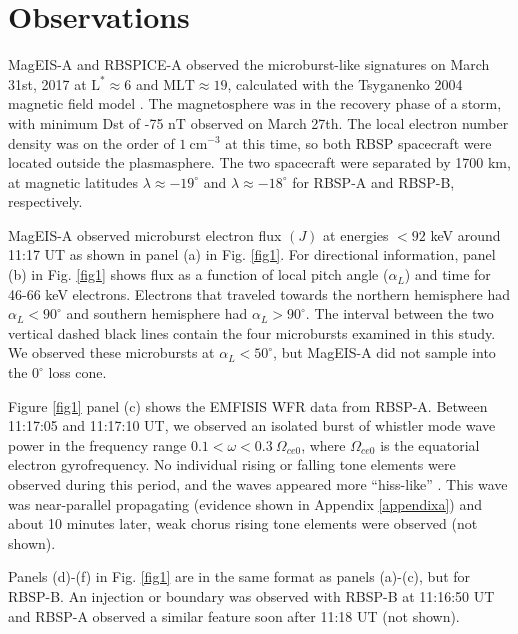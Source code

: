 \section{Observations} \label{obs}
MagEIS-A and RBSPICE-A observed the microburst-like signatures on March 31st, 2017 at $\mathrm{L}^* \approx 6$ and $\mathrm{MLT} \approx 19$, calculated with the Tsyganenko 2004 magnetic field model \citep{Tsyganenko2005}. The magnetosphere was in the recovery phase of a storm, with minimum Dst of -75 nT observed on March 27th. The local electron number density was on the order of $1 \ \mathrm{cm}^{-3}$ at this time, so both RBSP spacecraft were located outside the plasmasphere. The two spacecraft were separated by 1700 km, at magnetic latitudes $\lambda {\approx} -19^\circ$ and $\lambda {\approx} -18^\circ$ for RBSP-A and RBSP-B, respectively.

MagEIS-A observed microburst electron flux $(J)$ at energies $< 92$ keV around 11:17 UT as shown in panel (a) in Fig. \ref{fig1}. For directional information, panel (b) in Fig. \ref{fig1} shows flux as a function of local pitch angle ($\alpha_{L}$) and time for 46-66 keV electrons. Electrons that traveled towards the northern hemisphere had $\alpha_{L} < 90^\circ$ and southern hemisphere had $\alpha_{L} > 90^\circ$. The interval between the two vertical dashed black lines contain the four microbursts examined in this study. We observed these microbursts at $\alpha_{L} < 50^\circ$, but MagEIS-A did not sample into the $0^\circ$ loss cone.

Figure \ref{fig1} panel (c) shows the EMFISIS WFR data from RBSP-A. Between 11:17:05 and 11:17:10 UT, we observed an isolated burst of whistler mode wave power in the frequency range $0.1 < \omega < 0.3 \ \Omega_{ce0}$, where $\Omega_{ce0}$ is the equatorial electron gyrofrequency. No individual rising or falling tone elements were observed during this period, and the waves appeared more ``hiss-like'' \citep[e.g.][]{Li2012}. This wave was near-parallel propagating (evidence shown in Appendix \ref{appendixa}) and about 10 minutes later, weak chorus rising tone elements were observed (not shown).

Panels (d)-(f) in Fig. \ref{fig1} are in the same format as panels (a)-(c), but for RBSP-B. An injection or boundary was observed with RBSP-B at 11:16:50 UT and RBSP-A observed a similar feature soon after 11:18 UT (not shown).

